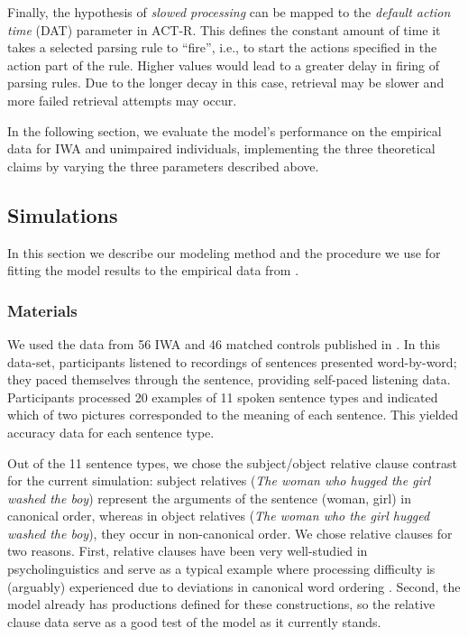 \documentclass{cambridge7A}\usepackage[]{graphicx}\usepackage[]{color}
\begin{document}
Finally, the hypothesis of \emph{slowed processing} can be mapped to the \emph{default action time} (DAT) parameter in ACT-R. This defines the constant amount of time it takes a selected parsing rule to ``fire'', i.e., to start the actions specified in the action part of the rule. Higher values would lead to a greater delay in firing of parsing rules. Due to the longer decay in this case, retrieval may be slower and more failed retrieval attempts may occur. 

In the following section, we evaluate the model's performance on the empirical data for IWA and unimpaired individuals, implementing the three theoretical claims by varying the three parameters described above. 

\subsection{Simulations}

In this section we describe our modeling method and the procedure we use for fitting the model results to the empirical data from \cite{CaplanEtAl2015}.

\subsubsection{Materials}

We used the data from 56 IWA and 46 matched controls published in \cite{CaplanEtAl2015}. In this data-set, participants listened to recordings of sentences presented word-by-word; they paced themselves through the sentence, providing self-paced listening data. Participants processed 20 examples of 11 spoken sentence types and indicated which of two pictures corresponded to the meaning of each sentence. This yielded accuracy data for each sentence type. 

Out of the 11 sentence types, we chose the subject/object relative clause contrast for the current simulation:
subject relatives (\textit{The woman who hugged the girl washed the boy}) represent the arguments of the sentence (woman, girl) in canonical order, whereas in object relatives (\textit{The woman who the girl hugged washed the boy}), they occur in non-canonical order.
We chose relative clauses for two reasons. First, relative clauses have been very well-studied in psycholinguistics and serve as a typical example where processing difficulty is (arguably) experienced due to deviations in canonical word ordering \citep{JustCarpenter1992}.
Second, the \cite{LewisVasishth2005} model already has productions defined for these constructions, so the relative clause data serve as a good test of the model as it currently stands.
\end{document}
